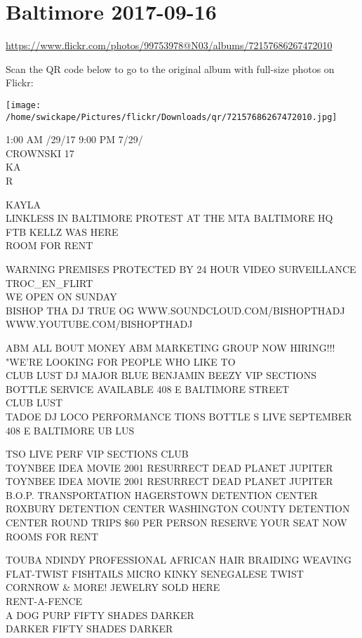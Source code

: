 \documentclass[10pt,letterpaper]{article}
\begin{document}
\section*{Baltimore 2017-09-16}

\url{https://www.flickr.com/photos/99753978@N03/albums/72157686267472010}

Scan the QR code below to go to the original album with full-size photos on Flickr:

\texttt{[image: /home/swickape/Pictures/flickr/Downloads/qr/72157686267472010.jpg]}


1:00 AM /29/17 9:00 PM 7/29/\\
CROWNSKI 17\\
KA\\
R

KAYLA\\
LINKLESS IN BALTIMORE PROTEST AT THE MTA BALTIMORE HQ\\
FTB KELLZ WAS HERE\\
ROOM FOR RENT

WARNING PREMISES PROTECTED BY 24 HOUR VIDEO SURVEILLANCE\\
TROC\_EN\_FLIRT\\
WE OPEN ON SUNDAY\\
BISHOP THA DJ TRUE OG WWW.SOUNDCLOUD.COM/BISHOPTHADJ WWW.YOUTUBE.COM/BISHOPTHADJ

ABM ALL BOUT MONEY ABM MARKETING GROUP NOW HIRING!!! "WE'RE LOOKING FOR PEOPLE WHO LIKE TO\\
CLUB LUST DJ MAJOR BLUE BENJAMIN BEEZY VIP SECTIONS BOTTLE SERVICE AVAILABLE 408 E BALTIMORE STREET\\
CLUB LUST\\
TADOE DJ LOCO PERFORMANCE TIONS BOTTLE S LIVE SEPTEMBER 408 E BALTIMORE UB LUS

TSO LIVE PERF VIP SECTIONS CLUB\\
TOYNBEE IDEA MOVIE 2001 RESURRECT DEAD PLANET JUPITER TOYNBEE IDEA MOVIE 2001 RESURRECT DEAD PLANET JUPITER\\
B.O.P. TRANSPORTATION HAGERSTOWN DETENTION CENTER ROXBURY DETENTION CENTER WASHINGTON COUNTY DETENTION CENTER ROUND TRIPS \$60 PER PERSON RESERVE YOUR SEAT NOW\\
ROOMS FOR RENT

TOUBA NDINDY PROFESSIONAL AFRICAN HAIR BRAIDING WEAVING FLAT{-}TWIST FISHTAILS MICRO KINKY SENEGALESE TWIST CORNROW \& MORE!  JEWELRY SOLD HERE\\
RENT{-}A{-}FENCE\\
A DOG PURP FIFTY SHADES DARKER\\
DARKER FIFTY SHADES DARKER
\end{document}
